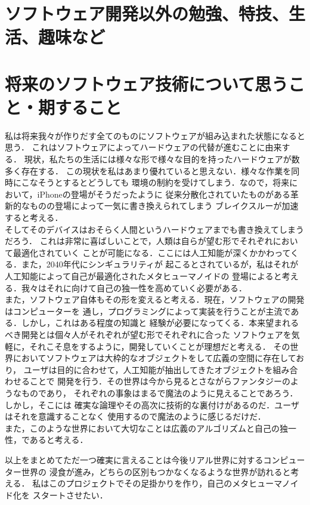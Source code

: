 \documentclass[11pt,onecolumn]{jsarticle}
\begin{document}
\section{ソフトウェア開発以外の勉強、特技、生活、趣味など}
\section{将来のソフトウェア技術について思うこと・期すること}
私は将来我々が作りだす全てのものにソフトウェアが組み込まれた状態になると思う．
これはソフトウェアによってハードウェアの代替が進むことに由来する．
現状，私たちの生活には様々な形で様々な目的を持ったハードウェアが数多く存在する．
この現状を私はあまり優れていると思えない．様々な作業を同時にこなそうとするとどうしても
環境の制約を受けてしまう．なので，将来において，iPhoneの登場がそうだったように
従来分散化されていたものがある革新的なものの登場によって一気に書き換えられてしまう
ブレイクスルーが加速すると考える．\\
そしてそのデバイスはおそらく人間というハードウェアまでも書き換えてしまうだろう．
これは非常に喜ばしいことで，人類は自らが望む形でそれぞれにおいて最適化されていく
ことが可能になる．ここには人工知能が深くかかわってくる．また，2040年代にシンギュラリティが
起こるとされているが，私はそれが人工知能によって自己が最適化されたメタヒューマノイドの
登場によると考える．我々はそれに向けて自己の独一性を高めていく必要がある．\\

また，ソフトウェア自体もその形を変えると考える．現在，ソフトウェアの開発はコンピューターを
通し，プログラミングによって実装を行うことが主流である．しかし，これはある程度の知識と
経験が必要になってくる．本来望まれるべき開発とは個々人がそれぞれが望む形でそれぞれに合った
ソフトウェアを気軽に，それこそ息をするように，開発していくことが理想だと考える．
その世界においてソフトウェアは大枠的なオブジェクトをして広義の空間に存在しており，
ユーザは目的に合わせて，人工知能が抽出してきたオブジェクトを組み合わせることで
開発を行う．その世界は今から見るとさながらファンタジーのようなものであり，
それぞれの事象はまるで魔法のように見えることであろう．しかし，そこには
確実な論理やその高次に技術的な裏付けがあるのだ．ユーザはそれを意識することなく
使用するので魔法のように感じるだけだ．\\

また，このような世界において大切なことは広義のアルゴリズムと自己の独一性，であると考える．




以上をまとめてただ一つ確実に言えることは今後リアル世界に対するコンピューター世界の
浸食が進み，どちらの区別もつかなくなるような世界が訪れると考える．
私はこのプロジェクトでその足掛かりを作り，自己のメタヒューマノイド化を
スタートさせたい．


\end{document}
